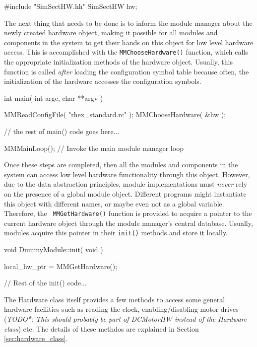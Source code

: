 \begin{codesegment}
#include "SimSectHW.hh"
SimSectHW hw;
\end{codesegment}

The next thing that needs to be done is to inform the module manager about
the newly created hardware object, making it possible for all modules and
components in the system to get their hands on this object for low level
hardware access. This is accomplished with the {\tt MMChooseHardware()}
function, which calls the appropriate initialization methods of the hardware
object. Usually, this function is called {\em after} loading the
configuration symbol table because often, the initialization of the hardware
accesses the configuration symbols.

\begin{codesegment}
int main( int argc, char **argv ) {

  MMReadConfigFile( "rhex_standard.rc" );
  MMChooseHardware( &hw );

  // the rest of main() code goes here...

  MMMainLoop(); // Invoke the main module manager loop
}
\end{codesegment}

Once these steps are completed, then all the modules and components in the
system can access low level hardware functionality through this
object. However, due to the data abstraction principles, module
implementations must {\em never} rely on the presence of a global module
object. Different programs might instantiate this object with different
names, or maybe even not as a global variable. Therefore, the {\tt
  MMGetHardware()} function is provided to acquire a pointer to the current
hardware object through the module manager's central database. Usually,
modules acquire this pointer in their {\tt init()} methods and store it
locally.

\begin{codesegment}
void DummyModule::init( void ) {

  local_hw_ptr = MMGetHardware();

  // Rest of the init() code...
}
\end{codesegment}

The Hardware class itself provides a few methods to access some general
hardware facilities such as reading the clock, enabling/disabling motor
drives ({\em *TODO*: This should probably be part of DCMotorHW instead of
  the Hardware class}) etc. The details of these methdos are explained in
Section \ref{sec:hardware_class}.

